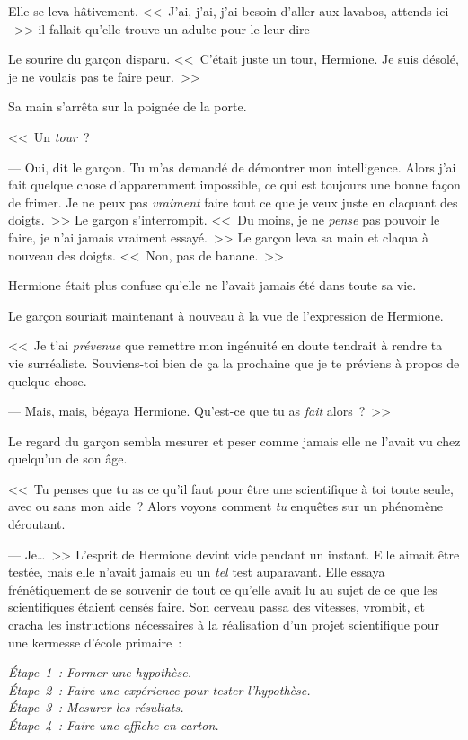 Elle se leva hâtivement. <<~J'ai, j'ai, j'ai besoin d'aller aux lavabos, attends ici~-~>> il fallait qu'elle trouve un adulte pour le leur dire~-

Le sourire du garçon disparu. <<~C'était juste un tour, Hermione. Je suis désolé, je ne voulais pas te faire peur.~>>

Sa main s'arrêta sur la poignée de la porte.

<<~Un \emph{tour}~?

--- Oui, dit le garçon. Tu m'as demandé de démontrer mon intelligence. Alors j'ai fait quelque chose d'apparemment impossible, ce qui est toujours une bonne façon de frimer. Je ne peux pas \emph{vraiment} faire tout ce que je veux juste en claquant des doigts.~>> Le garçon s'interrompit. <<~Du moins, je ne \emph{pense} pas pouvoir le faire, je n'ai jamais vraiment essayé.~>> Le garçon leva sa main et claqua à nouveau des doigts. <<~Non, pas de banane.~>>

Hermione était plus confuse qu'elle ne l'avait jamais été dans toute sa vie.

Le garçon souriait maintenant à nouveau à la vue de l'expression de Hermione.

<<~Je t'ai \emph{prévenue} que remettre mon ingénuité en doute tendrait à rendre ta vie surréaliste. Souviens-toi bien de ça la prochaine que je te préviens à propos de quelque chose.

--- Mais, mais, bégaya Hermione. Qu'est-ce que tu as \emph{fait} alors~?~>>

Le regard du garçon sembla mesurer et peser comme jamais elle ne l'avait vu chez quelqu'un de son âge.

<<~Tu penses que tu as ce qu'il faut pour être une scientifique à toi toute seule, avec ou sans mon aide~? Alors voyons comment \emph{tu} enquêtes sur un phénomène déroutant.

--- Je…~>> L'esprit de Hermione devint vide pendant un instant. Elle aimait être testée, mais elle n'avait jamais eu un \emph{tel} test auparavant. Elle essaya frénétiquement de se souvenir de tout ce qu'elle avait lu au sujet de ce que les scientifiques étaient censés faire. Son cerveau passa des vitesses, vrombit, et cracha les instructions nécessaires à la réalisation d'un projet scientifique pour une kermesse d'école primaire~:

\emph{Étape~1~: Former une hypothèse.\\
Étape~2~: Faire une expérience pour tester l'hypothèse.\\
Étape~3~: Mesurer les résultats.\\
Étape~4~: Faire une affiche en carton.}

